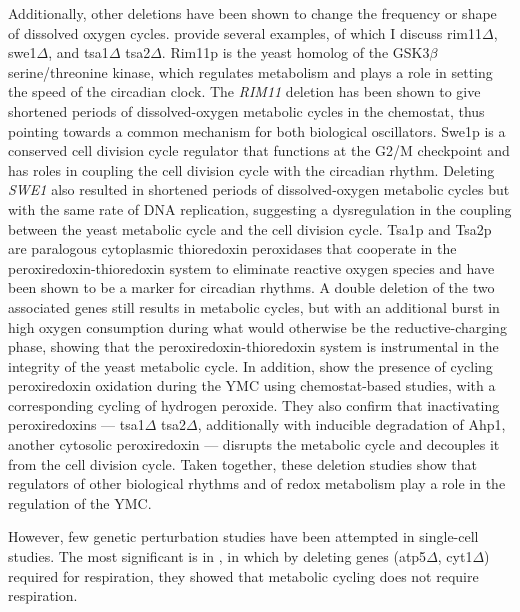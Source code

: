 Additionally, other deletions have been shown to change the frequency or shape of dissolved oxygen cycles.
\textcite{caustonMetabolicCyclesYeast2015} provide several examples, of which I discuss rim11$\Delta$, swe1$\Delta$, and tsa1$\Delta$ tsa2$\Delta$. %
Rim11p is the yeast homolog of the GSK3$\beta$ serine/threonine kinase, which regulates metabolism and plays a role in setting the speed of the circadian clock.
The \emph{RIM11} deletion has been shown to give shortened periods of dissolved-oxygen metabolic cycles in the chemostat, thus pointing towards a common mechanism for both biological oscillators.
Swe1p is a conserved cell division cycle regulator that functions at the G2/M checkpoint and has roles in coupling the cell division cycle with the circadian rhythm.
Deleting \emph{SWE1} also resulted in shortened periods of dissolved-oxygen metabolic cycles but with the same rate of DNA replication, suggesting a dysregulation in the coupling between the yeast metabolic cycle and the cell division cycle.
Tsa1p and Tsa2p are paralogous cytoplasmic thioredoxin peroxidases that cooperate in the peroxiredoxin-thioredoxin system to eliminate reactive oxygen species and have been shown to be a marker for circadian rhythms.
A double deletion of the two associated genes still results in metabolic cycles, but with an additional burst in high oxygen consumption during what would otherwise be the reductive-charging phase, showing that the peroxiredoxin-thioredoxin system is instrumental in the integrity of the yeast metabolic cycle.
In addition, \textcite{amponsahPeroxiredoxinsCoupleMetabolism2021} show the presence of cycling peroxiredoxin oxidation during the YMC using chemostat-based studies, with a corresponding cycling of hydrogen peroxide.
They also confirm that inactivating peroxiredoxins --- tsa1$\Delta$ tsa2$\Delta$, additionally with inducible degradation of Ahp1, another cytosolic peroxiredoxin --- disrupts the metabolic cycle and decouples it from the cell division cycle.
Taken together, these deletion studies show that regulators of other biological rhythms and of redox metabolism play a role in the regulation of the YMC.

However, few genetic perturbation studies have been attempted in single-cell studies.
The most significant is in \textcite{baumgartnerFlavinbasedMetabolicCycles2018}, in which by deleting genes (atp5$\Delta$, cyt1$\Delta$) required for respiration, they showed that metabolic cycling does not require respiration.


